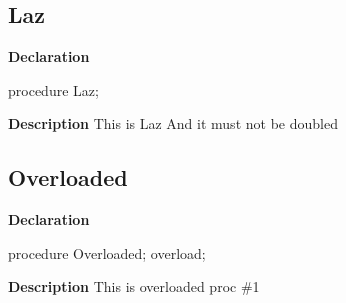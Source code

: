 \documentclass{report}
\begin{document}
\subsection*{Laz}
\begin{list}{}{
\setlength{\itemindent}{0cm}
\setlength{\listparindent}{0cm}
\setlength{\leftmargin}{\evensidemargin}
\addtolength{\leftmargin}{\tmplength}
\settowidth{\labelsep}{X}
\addtolength{\leftmargin}{\labelsep}
\setlength{\labelwidth}{\tmplength}
}
\begin{flushleft}
\item[\textbf{Declaration}\hfill]
\begin{ttfamily}
procedure Laz;\end{ttfamily}


\end{flushleft}
\par
\item[\textbf{Description}]
This is Laz And it must not be doubled

\end{list}
\subsection*{Overloaded}
\begin{list}{}{
\setlength{\itemindent}{0cm}
\setlength{\listparindent}{0cm}
\setlength{\leftmargin}{\evensidemargin}
\addtolength{\leftmargin}{\tmplength}
\settowidth{\labelsep}{X}
\addtolength{\leftmargin}{\labelsep}
\setlength{\labelwidth}{\tmplength}
}
\begin{flushleft}
\item[\textbf{Declaration}\hfill]
\begin{ttfamily}
procedure Overloaded; overload;\end{ttfamily}


\end{flushleft}
\par
\item[\textbf{Description}]
This is overloaded proc {\#}1

\end{list}
\end{document}
